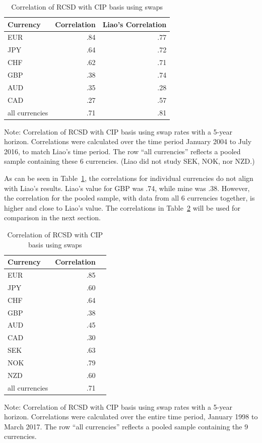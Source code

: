 \begin{table}[h]
\caption{\label{liao_correl_table} Correlation of RCSD with CIP basis using swaps}
\centering
\begin{tabular}{ |l|r|r| }
\hline
Currency & Correlation & Liao's Correlation \\
\hline
EUR & .84 & .77 \\
JPY & .64 & .72 \\
CHF & .62 & .71 \\
GBP & .38 & .74 \\
AUD & .35 & .28 \\
CAD & .27 & .57 \\
all currencies & .71 & .81 \\  %
\hline
\end{tabular}

\raggedright 
 Note: {\small Correlation of RCSD with CIP basis using swap rates with a 5-year horizon.  Correlations were calculated over the time period January 2004 to July 2016, to match Liao's time period.  The row ``all currencies'' reflects a pooled sample containing these 6 currencies. (Liao did not study SEK, NOK, nor NZD.)}
\end{table}

As can be seen in Table~\ref{liao_correl_table}, the correlations for individual currencies do not align with Liao's results.  Liao's value for GBP was .74, while mine was .38.  However, the correlation for the pooled sample, with data from all 6 currencies together, is higher and close to Liao's value.  The correlations in  Table~\ref{liao_correl_table2} will be used for comparison in the next section.

\begin{table}[h]
\caption{\label{liao_correl_table2} Correlation of RCSD with CIP basis using swaps}
\centering
\begin{tabular}{ |l|r|r| }
\hline
Currency & Correlation \\
\hline
EUR & .85 \\
JPY & .60  \\
CHF & .64 \\
GBP & .38 \\
AUD & .45 \\
CAD & .30 \\
SEK & .63 \\
NOK & .79 \\
NZD & .60 \\
all currencies & .71 \\
\hline
\end{tabular}

\raggedright 
 Note: {\small Correlation of RCSD with CIP basis using swap rates with a 5-year horizon.  Correlations were calculated over the entire time period, January 1998 to March 2017.   The row ``all currencies'' reflects a pooled sample containing the 9 currencies.}
\end{table}
 

